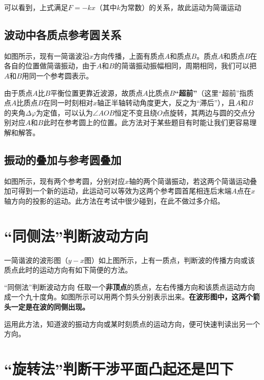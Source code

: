 可以看到，上式满足$F=-kx$（其中$k$为常数）的关系，故此运动为简谐运动

\subsection{波动中各质点参考圆关系}



如图所示，现有一简谐波沿$x$方向传播，上面有质点$A$和质点$B$。质点$A$和质点$B$在各自的位置做简谐振动，由于$A$和$B$的简谐振动振幅相同，周期相同，我们可以把$A$和$B$用同一个参考圆表示。

由于质点$A$比$B$平衡位置更靠近波源，故质点$A$比质点$B$\textbf{“超前”}（这里“超前”指质点$A$比质点$B$在同一时刻相对$x$轴正半轴转动角度更大，反之为“滞后”），且$A$和$B$的夹角$\Delta \varphi$为定值，可以认为$\angle AOB$恒定不变且绕$O$点旋转，其两边与圆的交点分别对应$A$和$B$此时在参考圆上的位置。此方法对于某些题目有时能让我们更容易理解和解答。

\subsection{振动的叠加与参考圆叠加}



如图所示，现有两个参考圆，分别对应$x$轴的两个简谐振动，若这两个简谐运动叠加可得到一个新的运动，此运动可以等效为这两个参考圆首尾相连后末端$A$点在$x$轴方向的投影的运动。此方法在考试中很少碰到，在此不做过多介绍。

\section{“同侧法”判断波动方向}



一简谐波的波形图（$y - x$图）如上图所示，上有一质点，判断波的传播方向或该质点此时的运动方向有如下简便的方法。

\begin{theo}{“同侧法”判断波动方向}{}
任取一个\textbf{非顶点}的质点，左右传播方向和该质点运动方向成一个九十度角。如图所示可以用两个剪头分别表示出来。\textbf{在波形图中，这两个箭头一定是在波的同侧出现。}

运用此方法，知道波的振动方向或某时刻质点的运动方向，便可快速判读出另一个方向。

\end{theo}

\section{“旋转法”判断干涉平面凸起还是凹下}

